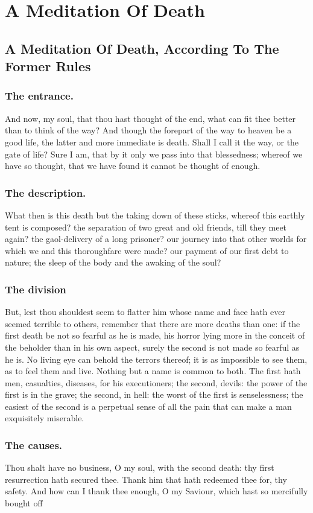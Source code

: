 \part*{A Meditation Of Death}
\chapter*{A Meditation Of Death, According To The Former Rules}
\section{The entrance.}
And now, my soul, that thou hast thought of the end, what can fit thee better than to think of the way? And though the forepart of the way to heaven be a good life, the latter and more immediate is death. Shall I call it the way, or the gate of life? Sure I am, that by it only we pass into that blessedness; whereof we have so thought, that we have found it cannot be thought of enough. 

\section{The description.}
What then is this death but the taking down of these sticks, whereof this earthly tent is composed? the separation of two great and old friends, till they meet again? the gaol-delivery of a long prisoner? our journey into that other worlds for which we and this thoroughfare were made? our payment of our first debt to nature; the sleep of the body and the awaking of the soul? 

\section{The division}
But, lest thou shouldest seem to flatter him whose name and face hath ever seemed terrible to others, remember that there are more deaths than one: if the first death be not so fearful as he is made, his horror lying more in the conceit of the beholder than in his own aspect, surely the second is not made so fearful as he is. No living eye can behold the terrors thereof; it is as impossible to see them, as to feel them and live. Nothing but a name is common to both. The first hath men, casualties, diseases, for his executioners; the second, devils: the power of the first is in the grave; the second, in hell: the worst of the first is senselessness; the easiest of the second is a perpetual sense of all the pain that can make a man exquisitely miserable. 

\section{The causes.}
Thou shalt have no business, O my soul, with the second death: thy first resurrection hath secured thee. Thank him that hath redeemed thee for, thy safety. And how can I thank thee enough, O my Saviour, which hast so mercifully bought off 
 